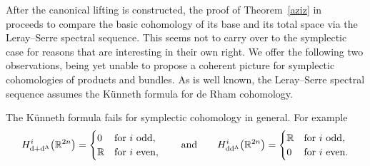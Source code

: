 \documentclass[10pt,a4paper]{amsart}
\numberwithin{equation}{section}
\begin{document}
After the canonical lifting is constructed, the proof of Theorem~\ref{aziz} in~\cite{aziztopologiczny} proceeds to compare the basic cohomology of its base and its total space via the Leray--Serre spectral sequence. This seems not to carry over to the symplectic case for reasons that are interesting in their own right. We offer the following two observations, being yet unable to propose a coherent picture for symplectic cohomologies of products and bundles. As is well known, the Leray--Serre spectral sequence assumes the K\"{u}nneth formula for de Rham cohomology.
\begin{Example}\label{disc}
The K\"unneth formula fails for symplectic cohomology in general. For example
\begin{gather*}
H^{i}_{{\rm d}+{\rm d}^{\Lambda}}\big(\mathbb{R}^{2n}\big)=\begin{cases}0 & \text{for $i$ odd}, \\ \mathbb{R} & \text{for $i$ even}, \end{cases}
\qquad \text{and}\qquad
H^{i}_{{\rm d}{\rm d}^{\Lambda}}\big(\mathbb{R}^{2n}\big)=\begin{cases}\mathbb{R} & \text{for $i$ odd}, \\ 0 & \text{for $i$ even}. \end{cases}
\end{gather*}
\end{Example}
\end{document}

